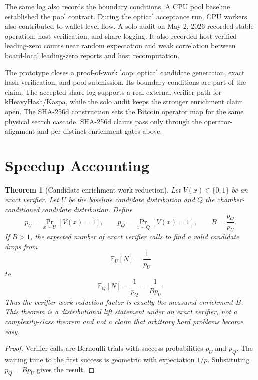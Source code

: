 \documentclass[11pt]{article}
\newtheorem{theorem}{Theorem}[section]
\theoremstyle{definition}
\theoremstyle{remark}
\begin{document}
The same log also records the boundary conditions. A CPU pool baseline
established the pool contract. During the optical acceptance run, CPU workers
also contributed to wallet-level flow. A solo audit on May 2, 2026 recorded stable
operation, host verification, and share logging. It also recorded
host-verified leading-zero counts near random expectation and weak correlation
between board-local leading-zero reports and host recomputation.

The prototype closes a proof-of-work loop: optical candidate generation, exact
hash verification, and pool submission. Its boundary conditions are part of the
claim. The accepted-share log supports a real external-verifier path for
kHeavyHash/Kaspa, while the solo audit keeps the stronger enrichment claim open.
The SHA-256d construction sets the Bitcoin operator map for the same physical
search cascade. SHA-256d claims pass only through the operator-alignment and
per-distinct-enrichment gates above.

\section{Speedup Accounting}

\begin{theorem}[Candidate-enrichment work reduction]\label{thm:candidate-enrichment}
Let \(V(x)\in\{0,1\}\) be an exact verifier. Let \(U\) be the baseline candidate distribution and
\(Q\) the chamber-conditioned candidate distribution. Define
\[
p_U=\Pr_{x\sim U}[V(x)=1],
\qquad
p_Q=\Pr_{x\sim Q}[V(x)=1],
\qquad
B=\frac{p_Q}{p_U}.
\]
If \(B>1\), the expected number of exact verifier calls to find a valid candidate drops from
\[
\mathbb E_U[N]=\frac{1}{p_U}
\]
to
\[
\mathbb E_Q[N]=\frac{1}{p_Q}=\frac{1}{B p_U}.
\]
Thus the verifier-work reduction factor is exactly the measured enrichment \(B\). This theorem is
a distributional lift statement under an exact verifier, not a complexity-class theorem and not a
claim that arbitrary hard problems become easy.
\end{theorem}

\begin{proof}
Verifier calls are Bernoulli trials with success probabilities \(p_U\) and \(p_Q\). The waiting
time to the first success is geometric with expectation \(1/p\). Substituting
\(p_Q=Bp_U\) gives the result.
\end{proof}
\end{document}

